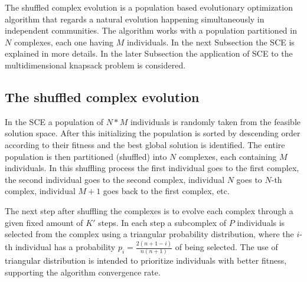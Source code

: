 \documentclass[10pt,conference, compsocconf]{IEEEtran}
\begin{document}


The shuffled complex evolution is a population
based evolutionary optimization algorithm that regards a natural 
evolution happening simultaneously in independent communities.
The algorithm works with a population partitioned in $N$ complexes, each one
having $M$ individuals.
In the next Subsection the SCE is explained in more details.
In the later Subsection the application of SCE to the multidimensional knapsack
problem is considered.


\subsection{The shuffled complex evolution}
In the SCE a population of $N*M$ individuals is randomly taken from the
feasible solution space.
After this initializing the population is sorted by descending order according
to their fitness and the best global solution is identified.
The entire population is then partitioned (shuffled) into $N$ complexes,
each containing $M$ individuals.
In this shuffling process the first individual goes to the first complex, the second
individual goes to the second complex, individual $N$ goes to $N$-th complex,
individual $M+1$ goes back to the first complex, etc.

The next step after shuffling the complexes is to evolve each complex through
a given fixed amount of $K'$ steps.
In each step a subcomplex of $P$ individuals is selected from the
complex using a triangular probability distribution, where the $i$-th individual
has a probability $p_i = \frac{2(n+1-i)}{n(n+1)}$ of being selected.
The use of triangular distribution is intended to prioritize individuals with
better fitness, supporting the algorithm convergence rate.
\end{document}
